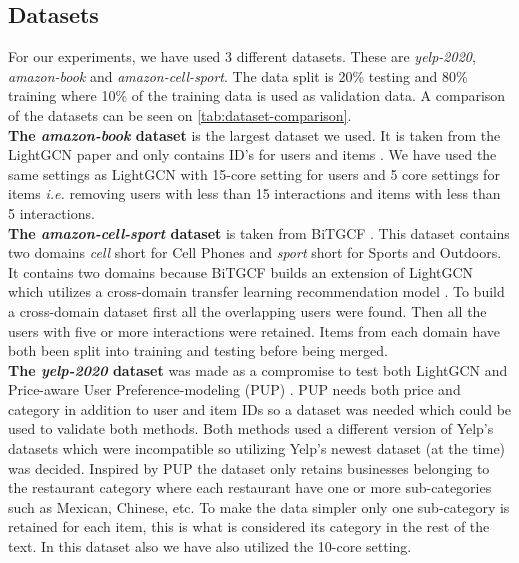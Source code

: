 \subsection{Datasets}
For our experiments, we have used 3 different datasets.
These are \textit{yelp-2020}, \textit{amazon-book} and \textit{amazon-cell-sport}.
The data split is 20\% testing and 80\% training where 10\% of the training data is used as validation data.
A comparison of the datasets can be seen on \autoref{tab:dataset-comparison}.
\\
\textbf{The \textit{amazon-book} dataset} is the largest dataset we used.
It is taken from the LightGCN paper and only contains ID's for users and items \cite{lightgcn}.
We have used the same settings as LightGCN with 15-core setting for users and 5 core settings for items \textit{i.e.} removing users with less than 15 interactions and items with less than 5 interactions.
\\
\textbf{The \textit{amazon-cell-sport} dataset} is taken from BiTGCF \cite{BiTGCF}.
This dataset contains two domains \textit{cell} short for Cell Phones and \textit{sport} short for Sports and Outdoors.
It contains two domains because BiTGCF builds an extension of LightGCN which utilizes a cross-domain transfer learning recommendation model \cite{BiTGCF}.
To build a cross-domain dataset first all the overlapping users were found.
Then all the users with five or more interactions were retained.
Items from each domain have both been split into training and testing before being merged.
\\
\textbf{The \textit{yelp-2020} dataset} was made as a compromise to test both LightGCN and Price-aware User Preference-modeling (PUP) \cite{PUP, lightgcn}.
PUP needs both price and category in addition to user and item IDs so a dataset was needed which could be used to validate both methods.
Both methods used a different version of Yelp's datasets which were incompatible so utilizing Yelp's newest dataset (at the time) was decided.
Inspired by PUP the dataset only retains businesses belonging to the restaurant category where each restaurant have one or more sub-categories such as Mexican, Chinese, etc.
To make the data simpler only one sub-category is retained for each item, this is what is considered its category in the rest of the text.
In this dataset also we have also utilized the 10-core setting.

